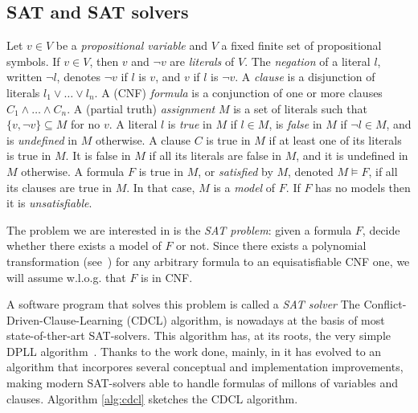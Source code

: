 \documentclass{llncs}
\begin{document}
\subsection{SAT and SAT solvers}
Let $v \in V $ be a \emph{propositional variable} and $V$
 a fixed finite set of propositional symbols.  If $v \in V$,
then $v$ and $\lnot v$ are \emph{literals} of $V$.  
The \emph{negation} of a literal $l$, written $\lnot l$, denotes 
$\lnot v$ if $l$ is $v$, and $v$ if $l$ is $\lnot v$.
A \emph{clause} is a disjunction of literals $l_1 \lor\ldots\lor l_n$.
A (CNF) \emph{formula} is a conjunction of one or
more clauses $C_1 \land\ldots\land C_n$. 
 A (partial truth) \emph{assignment} $M$ is a
set of literals such that $\{ v, \lnot v \} \subseteq M$ for no $v$. A
literal $l$ is \emph{true} in $M$ if $l \in M$, is \emph{false} in $M$
if $\lnot l \in M$, and is \emph{undefined} in $M$ otherwise. 
A clause $C$ is true in $M$ if at least one of its
literals is true in $M$.  It is false in $M$ if all its literals are
false in $M$, and it is undefined in $M$ otherwise. 
A formula $F$ is true in $M$, or
\emph{satisfied} by $M$, denoted $M\models F$, if all its clauses are
true in $M$.  In that case, $M$ is a \emph{model} of $F$.  If $F$ has
no models then it is \emph{unsatisfiable}.  

The problem we are interested in is the \emph{SAT problem}: given a
formula $F$, decide whether there exists a model of $F$ or not.
Since there exists a polynomial transformation
(see~\cite{Tseitin1968}) for any arbitrary formula to an
equisatisfiable CNF one, we will assume w.l.o.g. that $F$ is in CNF.

A software program that solves this problem is called a \emph{SAT solver}
The Conflict-Driven-Clause-Learning (CDCL) algorithm, is nowadays at the 
basis of most state-of-ther-art SAT-solvers\cite{gluclose,plingeling,cryptominisat}. 
This algorithm has, at its roots, the very 
simple DPLL algorithm~\cite{Davisetal1962CACM}. Thanks to the work done, mainly,
 in \cite{relsat,Chaff2001, GRASP1999IEEE, ZhangStickel1996IMATH, EenSorensson2003SAT,
picosat2008} it has evolved
 to an algorithm that incorpores several conceptual and implementation 
improvements, making modern SAT-solvers able to handle formulas of millons 
of variables and clauses. Algorithm \ref{alg:cdcl} sketches the CDCL algorithm.
\end{document}
